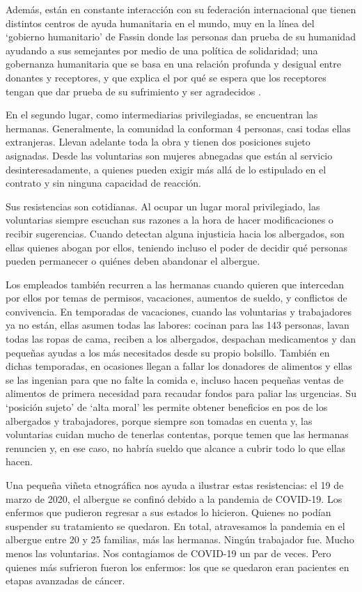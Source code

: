 \documentclass[
  spanish,
  11pt,
  a4paper,
]{scrbook}
\begin{document}
Además, están en constante interacción con su federación internacional
que tienen distintos centros de ayuda humanitaria en el mundo, muy en la
línea del `gobierno humanitario' de Fassin donde las personas dan prueba
de su humanidad ayudando a sus semejantes por medio de una política de
solidaridad; una gobernanza humanitaria que se basa en una relación
profunda y desigual entre donantes y receptores, y que explica el por
qué se espera que los receptores tengan que dar prueba de su sufrimiento
y ser agradecidos \autocite[75]{Schirilla2019}.

En el segundo lugar, como intermediarias privilegiadas, se encuentran
las hermanas. Generalmente, la comunidad la conforman 4 personas, casi
todas ellas extranjeras. Llevan adelante toda la obra y tienen dos
posiciones sujeto asignadas. Desde las voluntarias son mujeres abnegadas
que están al servicio desinteresadamente, a quienes pueden exigir más
allá de lo estipulado en el contrato y sin ninguna capacidad de
reacción.

Sus resistencias son cotidianas. Al ocupar un lugar moral privilegiado,
las voluntarias siempre escuchan sus razones a la hora de hacer
modificaciones o recibir sugerencias. Cuando detectan alguna injusticia
hacia los albergados, son ellas quienes abogan por ellos, teniendo
incluso el poder de decidir qué personas pueden permanecer o quiénes
deben abandonar el albergue.

Los empleados también recurren a las hermanas cuando quieren que
intercedan por ellos por temas de permisos, vacaciones, aumentos de
sueldo, y conflictos de convivencia. En temporadas de vacaciones, cuando
las voluntarias y trabajadores ya no están, ellas asumen todas las
labores: cocinan para las 143 personas, lavan todas las ropas de cama,
reciben a los albergados, despachan medicamentos y dan pequeñas ayudas a
los más necesitados desde su propio bolsillo. También en dichas
temporadas, en ocasiones llegan a fallar los donadores de alimentos y
ellas se las ingenian para que no falte la comida e, incluso hacen
pequeñas ventas de alimentos de primera necesidad para recaudar fondos
para paliar las urgencias. Su `posición sujeto' de `alta moral' les
permite obtener beneficios en pos de los albergados y trabajadores,
porque siempre son tomadas en cuenta y, las voluntarias cuidan mucho de
tenerlas contentas, porque temen que las hermanas renuncien y, en ese
caso, no habría sueldo que alcance a cubrir todo lo que ellas hacen.

Una pequeña viñeta etnográfica nos ayuda a ilustrar estas resistencias:
el 19 de marzo de 2020, el albergue se confinó debido a la pandemia de
COVID-19. Los enfermos que pudieron regresar a sus estados lo hicieron.
Quienes no podían suspender su tratamiento se quedaron. En total,
atravesamos la pandemia en el albergue entre 20 y 25 familias, más las
hermanas. Ningún trabajador fue. Mucho menos las voluntarias. Nos
contagiamos de COVID-19 un par de veces. Pero quienes más sufrieron
fueron los enfermos: los que se quedaron eran pacientes en etapas
avanzadas de cáncer.
\end{document}
